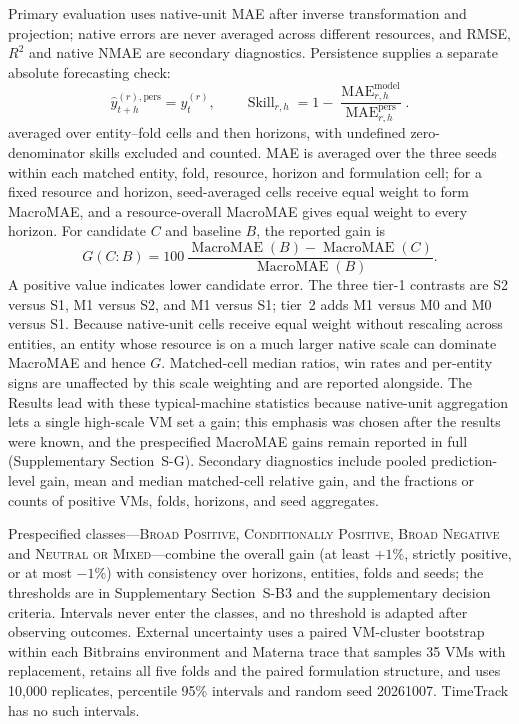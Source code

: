 \documentclass[5p,twocolumn]{elsarticle}
\begin{document}
Primary evaluation uses native-unit MAE after inverse transformation and
projection; native errors are never averaged across different resources, and
RMSE, $R^2$ and native NMAE are secondary diagnostics. Persistence supplies a
separate absolute forecasting check:
\begin{equation}
  \widehat{y}_{t+h}^{(r),\mathrm{pers}}=y_t^{(r)},
  \qquad
  \operatorname{Skill}_{r,h}
  =1-\frac{\operatorname{MAE}_{r,h}^{\mathrm{model}}}
           {\operatorname{MAE}_{r,h}^{\mathrm{pers}}}.
  \label{eq:persistence-skill}
\end{equation}
averaged over entity--fold cells and then horizons, with undefined
zero-denominator skills excluded and counted. MAE is averaged over the three
seeds within each matched entity, fold, resource, horizon and formulation
cell; for a fixed resource and horizon, seed-averaged cells receive equal
weight to form MacroMAE, and a resource-overall MacroMAE gives equal weight to
every horizon. For candidate $C$ and baseline $B$, the reported gain is
\begin{equation}
  G(C\!:\!B)=100\,
  \frac{\operatorname{MacroMAE}(B)-\operatorname{MacroMAE}(C)}
       {\operatorname{MacroMAE}(B)}.
  \label{eq:macro-gain}
\end{equation}
A positive value indicates lower candidate error.  The three tier-1
contrasts are S2 versus S1, M1 versus S2, and M1 versus S1; tier~2 adds M1
versus M0 and M0 versus S1. Because native-unit cells receive equal weight
without rescaling across entities, an entity whose resource is on a much
larger native scale can dominate MacroMAE and hence $G$. Matched-cell median
ratios, win rates and per-entity signs are unaffected by this scale
weighting and are reported alongside. The Results lead with these
typical-machine statistics because native-unit aggregation lets a single
high-scale VM set a gain; this emphasis was chosen after the results were
known, and the prespecified MacroMAE gains remain reported in full
(Supplementary Section~S-G). Secondary diagnostics include
pooled prediction-level gain, mean and median matched-cell relative gain, and
the fractions or counts of positive VMs, folds, horizons, and seed aggregates.

Prespecified classes---\textsc{Broad Positive},
\textsc{Conditionally Positive}, \textsc{Broad Negative} and
\textsc{Neutral or Mixed}---combine the overall gain (at least $+1\%$,
strictly positive, or at most $-1\%$) with consistency over horizons,
entities, folds and seeds; the thresholds are in Supplementary
Section~S-B3 and the supplementary decision criteria. Intervals never enter
the classes, and no threshold is adapted after observing outcomes. External
uncertainty uses a paired VM-cluster bootstrap within each Bitbrains
environment and Materna trace that samples 35 VMs with replacement, retains
all five folds and the paired formulation structure, and uses 10,000
replicates, percentile 95\% intervals and random seed 20261007. TimeTrack has
no such intervals.
\end{document}

